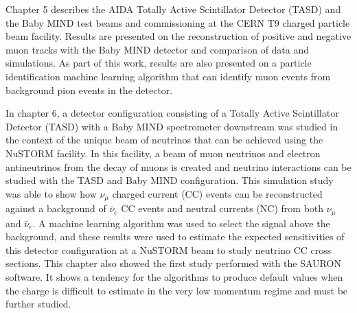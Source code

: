 
Chapter 5 describes the AIDA Totally Active Scintillator Detector (TASD) and the Baby MIND test beams and commissioning at the CERN T9 charged particle beam facility. Results are presented on the reconstruction of positive and negative muon tracks with the Baby MIND detector and comparison of data and simulations. As part of this work, results are also presented on a particle identification machine learning algorithm that can identify muon events from background pion events in the detector.


In chapter 6, a detector configuration consisting of a Totally Active Scintillator Detector (TASD) with a Baby MIND spectrometer downstream was studied in the context of the unique beam of neutrinos that can be achieved using the NuSTORM facility. In this facility, a beam of muon neutrinos and electron antineutrinos from the decay of muons is created and neutrino interactions can be studied with the TASD and Baby MIND configuration. This simulation study was able to show how $\nu_\mu$ charged current (CC) events can be reconstructed against a background of $\bar{\nu}_e$ CC events and neutral currents (NC) from both $\nu_\mu$ and $\bar{\nu}_e$. A machine learning algorithm was used to select the signal above the background, and these results were used to estimate the expected sensitivities of this detector configuration at a NuSTORM beam to study neutrino CC cross sections.  This chapter also showed the first study performed with the SAURON software. It shows a tendency for the algorithms to produce default values when the charge is difficult to estimate in the very low momentum regime and must be further studied.



